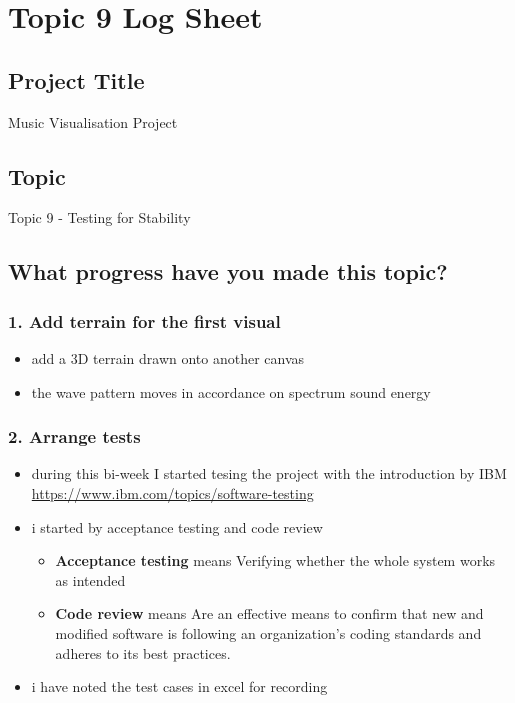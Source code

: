 \chapter*{Topic 9 Log Sheet}

\section*{Project Title}

Music Visualisation Project

\section*{Topic}

Topic 9 - Testing for Stability

\section*{What progress have you made this topic?}

\subsection*{1. Add terrain for the first visual}

\begin{itemize}
  \item add a 3D terrain drawn onto another canvas
  \item the wave pattern moves in accordance on spectrum sound energy
\end{itemize}

\subsection*{2. Arrange tests}

\begin{itemize}
  \item during this bi-week I started tesing the project with the introduction by IBM \url{https://www.ibm.com/topics/software-testing}
  \item i started by acceptance testing and code review
    \begin{itemize}
      \item \textbf{Acceptance testing} means Verifying whether the whole system works as intended
      \item \textbf{Code review} means Are an effective means to confirm that new and modified software is following an organization’s coding standards and adheres to its best practices.
    \end{itemize}
  \item i have noted the test cases in excel for recording
\end{itemize}

